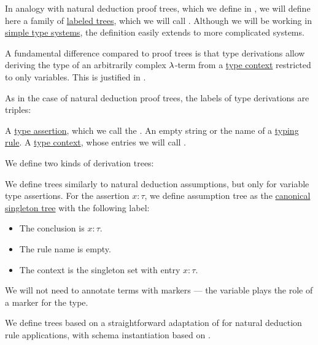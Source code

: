 \begin{definition}\label{def:type_derivation_tree}\mimprovised
  In analogy with natural deduction proof trees, which we define in , we will define here a family of \hyperref[def:labeled_tree]{labeled trees}, which we will call . Although we will be working in \hyperref[def:simple_type_system]{simple type systems}, the definition easily extends to more complicated systems.

  A fundamental difference compared to proof trees is that type derivations allow deriving the type of an arbitrarily complex \( \mathrm{\lambda} \)-term from a \hyperref[def:type_context]{type context} restricted to only variables. This is justified in .

  As in the case of natural deduction proof trees, the labels of type derivations are triples:
  \begin{thmenum}[series=def:type_derivation_tree]
     A \hyperref[def:type_assertion]{type assertion}, which we call the .
     An empty string or the name of a \hyperref[def:simple_typing_rule]{typing rule}.
     A \hyperref[def:type_context]{type context}, whose entries we will call .
  \end{thmenum}

  We define two kinds of derivation trees:
  \begin{thmenum}[resume=def:type_derivation_tree]
     We define  trees similarly to natural deduction assumptions, but only for variable type assertions. For the assertion \( x: \tau \), we define assumption tree as the \hyperref[def:canonical_singleton_tree]{canonical singleton tree} with the following label:
    \begin{itemize}
      \item The conclusion is \( x: \tau \).
      \item The rule name is empty.
      \item The context is the singleton set with entry \( x: \tau \).
    \end{itemize}

    We will not need to annotate terms with markers --- the variable plays the role of a marker for the type.

     We define  trees based on a straightforward adaptation of  for natural deduction rule applications, with schema instantiation based on .


\end{thmenum}
\end{definition}
